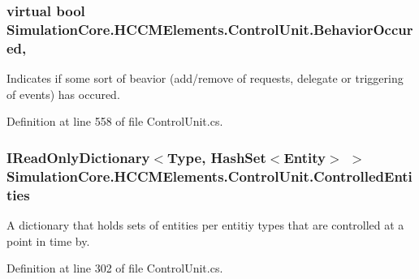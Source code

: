 \subsubsection[{\texorpdfstring{Behavior\+Occured}{BehaviorOccured}}]{\setlength{\rightskip}{0pt plus 5cm}virtual bool Simulation\+Core.\+H\+C\+C\+M\+Elements.\+Control\+Unit.\+Behavior\+Occured\hspace{0.3cm}{\ttfamily [get]}, {\ttfamily [set]}}\hypertarget{class_simulation_core_1_1_h_c_c_m_elements_1_1_control_unit_aaf47369d9e28b9b669af2d5f93d1cb57}{}\label{class_simulation_core_1_1_h_c_c_m_elements_1_1_control_unit_aaf47369d9e28b9b669af2d5f93d1cb57}


Indicates if some sort of beavior (add/remove of requests, delegate or triggering of events) has occured. 



Definition at line 558 of file Control\+Unit.\+cs.

\subsubsection[{\texorpdfstring{Controlled\+Entities}{ControlledEntities}}]{\setlength{\rightskip}{0pt plus 5cm}I\+Read\+Only\+Dictionary$<$Type, Hash\+Set$<${\bf Entity}$>$ $>$ Simulation\+Core.\+H\+C\+C\+M\+Elements.\+Control\+Unit.\+Controlled\+Entities\hspace{0.3cm}{\ttfamily [get]}}\hypertarget{class_simulation_core_1_1_h_c_c_m_elements_1_1_control_unit_aa3ea3aa1c41fb792989d62da8325698c}{}\label{class_simulation_core_1_1_h_c_c_m_elements_1_1_control_unit_aa3ea3aa1c41fb792989d62da8325698c}


A dictionary that holds sets of entities per entitiy types that are controlled at a point in time by. 



Definition at line 302 of file Control\+Unit.\+cs.

